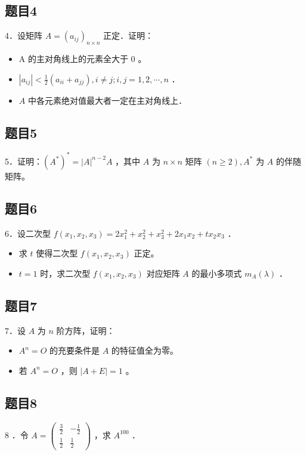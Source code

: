 \documentclass{article}
\begin{document}
\subsection{题目4}
4．设矩阵 \(A=\left(a_{i j}\right)_{n \times n}\) 正定．证明：

\begin{itemize}
  \item[（1）] A 的主对角线上的元素全大于 0 。
  \item[（2）] \(\left|a_{i j}\right|<\frac{1}{2}\left(a_{i i}+a_{j j}\right), i \neq j ; i, j=1,2, \cdots, n\) ．
  \item[（3）] \(A\) 中各元素绝对值最大者一定在主对角线上．
\end{itemize}

\subsection{题目5}
5．证明：\(\left(A^{*}\right)^{*}=|A|^{n-2} A\) ，其中 \(A\) 为 \(n \times n\) 矩阵 \((n \geq 2), A^{*}\) 为 \(A\) 的伴随矩阵。

\subsection{题目6}
6．设二次型 \(f\left(x_{1}, x_{2}, x_{3}\right)=2 x_{1}^{2}+x_{2}^{2}+x_{3}^{2}+2 x_{1} x_{2}+t x_{2} x_{3}\) ．

\begin{itemize}
  \item[（1）] 求 \(t\) 使得二次型 \(f\left(x_{1}, x_{2}, x_{3}\right)\) 正定。
  \item[（2）] \(t=1\) 时，求二次型 \(f\left(x_{1}, x_{2}, x_{3}\right)\) 对应矩阵 \(A\) 的最小多项式 \(m_{A}(\lambda)\) ．
\end{itemize}

\subsection{题目7}
7．设 \(A\) 为 \(n\) 阶方阵，证明：

\begin{itemize}
  \item[（1）] \(A^{n}=O\) 的充要条件是 \(A\) 的特征值全为零。
  \item[（2）] 若 \(A^{n}=O\) ，则 \(|A+E|=1\) 。
\end{itemize}

\subsection{题目8}
8 ．令 \(A=\left(\begin{array}{cc}\frac{3}{2} & -\frac{1}{2} \\ \frac{1}{2} & \frac{1}{2}\end{array}\right)\) ，求 \(A^{100}\) ．
\end{document}
